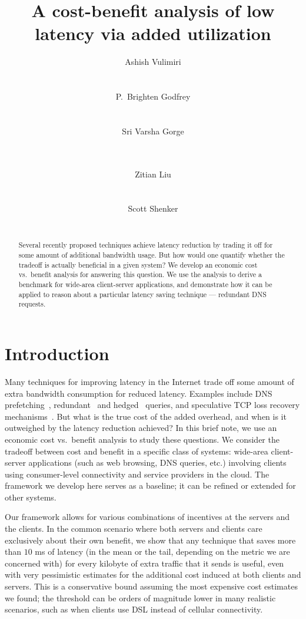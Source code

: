 \documentclass{sigcomm-alternate}
\title{A cost-benefit analysis of low latency via added utilization}
\author{
\alignauthor
Ashish Vulimiri\\
\affaddr{UIUC}\\
\email{vulimir1@illinois.edu}\\
\alignauthor
P.\ Brighten Godfrey\\
\affaddr{UIUC}\\
\email{pbg@illinois.edu}\\
\alignauthor
Sri Varsha Gorge\\
\affaddr{Salesforce}\\
\email{gorge.srivarsha@gmail.com}\\
\and  \alignauthor
Zitian Liu\\
\affaddr{Microsoft}\\
\email{liu236@illinois.edu}\\
\alignauthor
Scott Shenker\\
\affaddr{UC Berkeley and ICSI}\\
\email{shenker@icsi.berkeley.edu}
}
\date{}
\begin{document}
\maketitle

\begin{abstract}
Several recently proposed techniques achieve latency reduction by trading it off for some amount of additional bandwidth usage.  But how would one quantify whether the tradeoff is actually beneficial in a given system?  We develop an economic cost vs.\ benefit analysis for answering this question.  We use the analysis to derive a benchmark for wide-area client-server applications, and demonstrate how it can be applied to reason about a particular latency saving technique --- redundant DNS requests.
\end{abstract}

\section{Introduction}

Many techniques for improving latency in the Internet trade off some amount of extra bandwidth consumption for reduced latency.  Examples include DNS prefetching~\cite{ChromiumPrefetching}, redundant~\cite{Vulimiri2012,Vulimiri2013} and hedged~\cite{Dean2013} queries, and speculative TCP loss recovery mechanisms~\cite{Flach2013}.  But what is the true cost of the added overhead, and when is it outweighed by the latency reduction achieved?  In this brief note, we use an economic cost vs.\ benefit analysis to study these questions.  We consider the tradeoff between cost and benefit in a specific class of systems: wide-area client-server applications (such as web browsing, DNS queries, etc.) involving clients using consumer-level connectivity and service providers in the cloud.  The framework we develop here serves as a baseline; it can be refined or extended for other systems.

Our framework allows for various combinations of incentives at the servers and the clients.  In the common scenario where both servers and clients care exclusively about their own benefit, we show that any technique that saves more than $10$ ms of latency (in the mean or the tail, depending on the metric we are concerned with) for every kilobyte of extra traffic that it sends is useful, even with very pessimistic estimates for the additional cost induced at both clients and servers.  This is a conservative bound assuming the most expensive cost estimates we found; the threshold can be orders of magnitude lower in many realistic scenarios, such as when clients use DSL instead of cellular connectivity.
\end{document}
